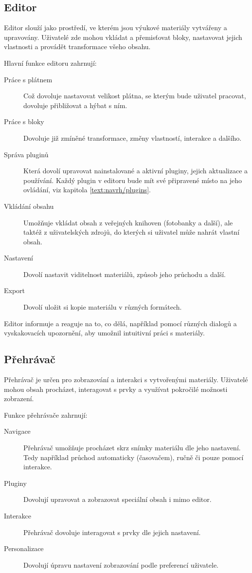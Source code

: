 \subsection{Editor}

Editor slouží jako prostředí, ve kterém jsou výukové materiály vytvářeny a upravovány. 
Uživatelé zde mohou vkládat a přemisťovat bloky, nastavovat jejich vlastnosti a provádět transformace všeho obsahu.

Hlavní funkce editoru zahrnují:
\begin{description}
    \item[Práce s plátnem] Což dovoluje nastavovat velikost plátna, se kterým bude uživatel pracovat, dovoluje přibližovat a hýbat s ním.
    \item[Práce s bloky] Dovoluje již zmíněné transformace, změny vlastností, interakce a dalšího.
    \item[Správa pluginů] Která dovolí upravovat nainstalované a aktivní pluginy, jejich aktualizace a používání. Každý plugin v editoru bude mít své připravené místo na jeho ovládání, viz kapitola \ref{text:navrh/plugins}.
    \item[Vkládání obsahu] Umožňuje vkládat obsah z veřejných knihoven (fotobanky a další), ale taktéž z uživatelských zdrojů, do kterých si uživatel může nahrát vlastní obsah.
    \item[Nastavení] Dovolí nastavit viditelnost materiálů, způsob jeho průchodu a další.
    \item[Export] Dovolí uložit si kopie materiálu v různých formátech.
\end{description}

Editor informuje a reaguje na to, co dělá, například pomocí různých dialogů a vyskakovacích upozornění, aby umožnil intuitivní práci s materiály.

\subsection{Přehrávač}

Přehrávač je určen pro zobrazování a interakci s vytvořenými materiály. 
Uživatelé mohou obsah procházet, interagovat s prvky a využívat pokročilé možnosti zobrazení.

Funkce přehrávače zahrnují:

\begin{description}
    \item[Navigace] Přehrávač umožňuje procházet skrz snímky materiálu dle jeho nastavení. Tedy například průchod automaticky (časovačem), ručně či pouze pomocí interakce.
    \item[Pluginy] Dovolují upravovat a zobrazovat speciální obsah i mimo editor.
    \item[Interakce] Přehrávač dovoluje interagovat s prvky dle jejich nastavení.
    \item[Personalizace] Dovolují úpravu nastavení zobrazování podle preferencí uživatele.
\end{description}

